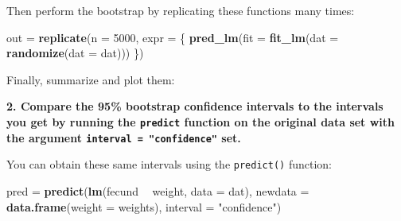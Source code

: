 \documentclass[]{book}
\newenvironment{Shaded}{\begin{snugshade}}{\end{snugshade}}
\newcommand{\KeywordTok}[1]{\textcolor[rgb]{0.13,0.29,0.53}{\textbf{#1}}}
\newcommand{\DataTypeTok}[1]{\textcolor[rgb]{0.13,0.29,0.53}{#1}}
\newcommand{\DecValTok}[1]{\textcolor[rgb]{0.00,0.00,0.81}{#1}}
\newcommand{\FloatTok}[1]{\textcolor[rgb]{0.00,0.00,0.81}{#1}}
\newcommand{\StringTok}[1]{\textcolor[rgb]{0.31,0.60,0.02}{#1}}
\newcommand{\ControlFlowTok}[1]{\textcolor[rgb]{0.13,0.29,0.53}{\textbf{#1}}}
\newcommand{\OperatorTok}[1]{\textcolor[rgb]{0.81,0.36,0.00}{\textbf{#1}}}
\newcommand{\NormalTok}[1]{#1}
\theoremstyle{definition}
\theoremstyle{definition}
\theoremstyle{definition}
\theoremstyle{remark}
\begin{document}
Then perform the bootstrap by replicating these functions many times:

\begin{Shaded}
\begin{Highlighting}[]
\NormalTok{out =}\StringTok{ }\KeywordTok{replicate}\NormalTok{(}\DataTypeTok{n =} \DecValTok{5000}\NormalTok{, }\DataTypeTok{expr =}\NormalTok{ \{}
  \KeywordTok{pred_lm}\NormalTok{(}\DataTypeTok{fit =} \KeywordTok{fit_lm}\NormalTok{(}\DataTypeTok{dat =} \KeywordTok{randomize}\NormalTok{(}\DataTypeTok{dat =}\NormalTok{ dat)))}
\NormalTok{\})}
\end{Highlighting}
\end{Shaded}

Finally, summarize and plot them:

\begin{Shaded}
\end{Shaded}

\textbf{2. Compare the 95\% bootstrap confidence intervals to the
intervals you get by running the \texttt{predict} function on the
original data set with the argument \texttt{interval\ =\ "confidence"}
set.}

You can obtain these same intervals using the \texttt{predict()}
function:

\begin{Shaded}
\begin{Highlighting}[]
\NormalTok{pred =}\StringTok{ }\KeywordTok{predict}\NormalTok{(}\KeywordTok{lm}\NormalTok{(fecund }\OperatorTok{~}\StringTok{ }\NormalTok{weight, }\DataTypeTok{data =}\NormalTok{ dat),}
               \DataTypeTok{newdata =} \KeywordTok{data.frame}\NormalTok{(}\DataTypeTok{weight =}\NormalTok{ weights),}
               \DataTypeTok{interval =} \StringTok{"confidence"}\NormalTok{)}
\end{Highlighting}
\end{Shaded}
\end{document}
